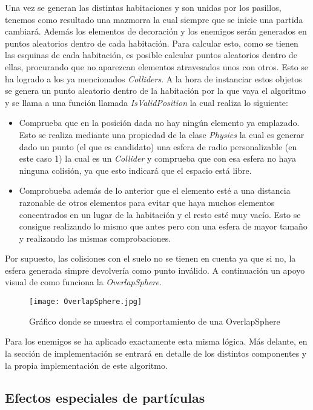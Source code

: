 Una vez se generan las distintas habitaciones y son unidas por los pasillos, tenemos como resultado una mazmorra la cual siempre que se inicie una partida cambiará. Además los elementos de decoración y los enemigos serán generados en puntos aleatorios dentro de cada habitación. Para calcular esto, como se tienen las esquinas de cada habitación, es posible calcular puntos aleatorios dentro de ellas, procurando que no aparezcan elementos atravesados unos con otros. Esto se ha logrado a los ya mencionados \textit{Colliders}. A la hora de instanciar estos objetos se genera un punto aleatorio dentro de la habitación por la que vaya el algoritmo y se llama a una función llamada \textit{IsValidPosition} la cual realiza lo siguiente: 

\begin{itemize}    
    \item Comprueba que en la posición dada no hay ningún elemento ya emplazado. Esto se realiza mediante una propiedad de la clase \textit{Physics} la cual es generar dado un punto (el que es candidato) una esfera de radio personalizable (en este caso 1) la cual es un \textit{Collider} y comprueba que con esa esfera no haya ninguna colisión, ya que esto indicará que el espacio está libre.
    \item Comprobueba además de lo anterior que el elemento esté a una distancia razonable de otros elementos para evitar que haya muchos elementos concentrados en un lugar de la habitación y el resto esté muy vacío. Esto se consigue realizando lo mismo que antes pero con una esfera de mayor tamaño y realizando las mismas comprobaciones.
\end{itemize}

Por supuesto, las colisiones con el suelo no se tienen en cuenta ya que si no, la esfera generada simpre devolvería como punto inválido. A continuación un apoyo visual de como funciona la \textit{OverlapSphere}.

\begin{figure}[H]
    \centering
    \texttt{[image: OverlapSphere.jpg]}
    \caption{Gráfico donde se muestra el comportamiento de una OverlapSphere}
\end{figure}

Para los enemigos se ha aplicado exactamente esta misma lógica. Más delante, en la sección de implementación se entrará en detalle de los distintos componentes y la propia implementación de este algoritmo.

\subsection{Efectos especiales de partículas}

